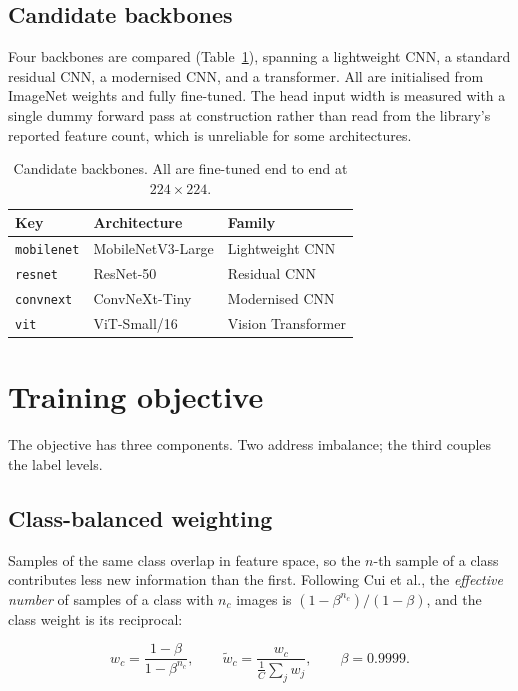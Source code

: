 \documentclass[11pt,a4paper]{article}
\begin{document}
\subsection{Candidate backbones}

Four backbones are compared (Table~\ref{tab:backbones}), spanning a lightweight
CNN, a standard residual CNN, a modernised CNN, and a transformer. All are
initialised from ImageNet weights and fully fine-tuned. The head input width is
measured with a single dummy forward pass at construction rather than read from
the library's reported feature count, which is unreliable for some
architectures.

\begin{table}[H]
  \centering
  \small
  \caption{Candidate backbones. All are fine-tuned end to end at
  $224 \times 224$.}
  \label{tab:backbones}
  \begin{tabular}{@{}lll@{}}
    \toprule
    Key & Architecture & Family \\
    \midrule
    \texttt{mobilenet} & MobileNetV3-Large & Lightweight CNN \\
    \texttt{resnet}    & ResNet-50         & Residual CNN \\
    \texttt{convnext}  & ConvNeXt-Tiny     & Modernised CNN \\
    \texttt{vit}       & ViT-Small/16      & Vision Transformer \\
    \bottomrule
  \end{tabular}
\end{table}

\section{Training objective}
\label{sec:loss}

The objective has three components. Two address imbalance; the third couples the
label levels.

\subsection{Class-balanced weighting}

Samples of the same class overlap in feature space, so the $n$-th sample of a
class contributes less new information than the first. Following Cui et al., the
\emph{effective number} of samples of a class with $n_c$ images is
$(1 - \beta^{n_c})/(1 - \beta)$, and the class weight is its reciprocal:

\begin{equation}
  w_c = \frac{1 - \beta}{1 - \beta^{n_c}},
  \qquad
  \tilde{w}_c = \frac{w_c}{\frac{1}{C}\sum_{j} w_j},
  \qquad \beta = 0.9999.
  \label{eq:cb}
\end{equation}
\end{document}
